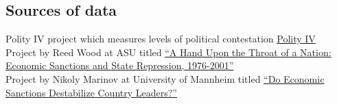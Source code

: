 \documentclass[a4paper]{article}\usepackage[]{graphicx}\usepackage[]{color}
\begin{document}
\begin{landscape}
\section{Sources of data}
Polity IV project which measures levels of political contestation \href{http://www.systemicpeace.org/polity/polity4.htm}{Polity IV} \\

Project by Reed Wood at ASU titled \href{https://dataverse.harvard.edu/dataset.xhtml?persistentId=hdl:1902.1/12261}{``A Hand Upon the Throat of a Nation: Economic Sanctions and State Repression, 1976-2001''} \\

Project by Nikoly Marinov at University of Mannheim titled \href{https://dataverse.harvard.edu/dataset.xhtml?persistentId=hdl:1902.1/19774}{``Do Economic Sanctions Destabilize Country Leaders?''} \\


\end{landscape}
\end{document}
